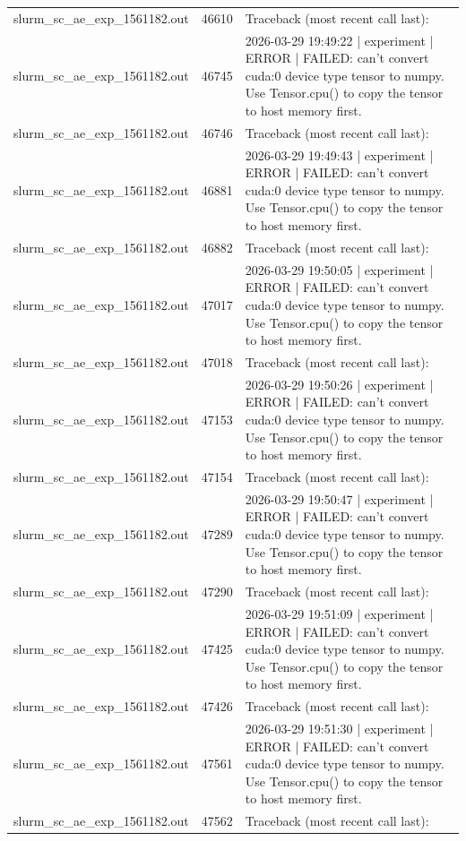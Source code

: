 \begin{tabular}{lrl}
slurm\_sc\_ae\_exp\_1561182.out & 46610 & Traceback (most recent call last): \\
slurm\_sc\_ae\_exp\_1561182.out & 46745 & 2026-03-29 19:49:22 | experiment | ERROR |   FAILED: can't convert cuda:0 device type tensor to numpy. Use Tensor.cpu() to copy the tensor to host memory first. \\
slurm\_sc\_ae\_exp\_1561182.out & 46746 & Traceback (most recent call last): \\
slurm\_sc\_ae\_exp\_1561182.out & 46881 & 2026-03-29 19:49:43 | experiment | ERROR |   FAILED: can't convert cuda:0 device type tensor to numpy. Use Tensor.cpu() to copy the tensor to host memory first. \\
slurm\_sc\_ae\_exp\_1561182.out & 46882 & Traceback (most recent call last): \\
slurm\_sc\_ae\_exp\_1561182.out & 47017 & 2026-03-29 19:50:05 | experiment | ERROR |   FAILED: can't convert cuda:0 device type tensor to numpy. Use Tensor.cpu() to copy the tensor to host memory first. \\
slurm\_sc\_ae\_exp\_1561182.out & 47018 & Traceback (most recent call last): \\
slurm\_sc\_ae\_exp\_1561182.out & 47153 & 2026-03-29 19:50:26 | experiment | ERROR |   FAILED: can't convert cuda:0 device type tensor to numpy. Use Tensor.cpu() to copy the tensor to host memory first. \\
slurm\_sc\_ae\_exp\_1561182.out & 47154 & Traceback (most recent call last): \\
slurm\_sc\_ae\_exp\_1561182.out & 47289 & 2026-03-29 19:50:47 | experiment | ERROR |   FAILED: can't convert cuda:0 device type tensor to numpy. Use Tensor.cpu() to copy the tensor to host memory first. \\
slurm\_sc\_ae\_exp\_1561182.out & 47290 & Traceback (most recent call last): \\
slurm\_sc\_ae\_exp\_1561182.out & 47425 & 2026-03-29 19:51:09 | experiment | ERROR |   FAILED: can't convert cuda:0 device type tensor to numpy. Use Tensor.cpu() to copy the tensor to host memory first. \\
slurm\_sc\_ae\_exp\_1561182.out & 47426 & Traceback (most recent call last): \\
slurm\_sc\_ae\_exp\_1561182.out & 47561 & 2026-03-29 19:51:30 | experiment | ERROR |   FAILED: can't convert cuda:0 device type tensor to numpy. Use Tensor.cpu() to copy the tensor to host memory first. \\
slurm\_sc\_ae\_exp\_1561182.out & 47562 & Traceback (most recent call last): \\

\end{tabular}
